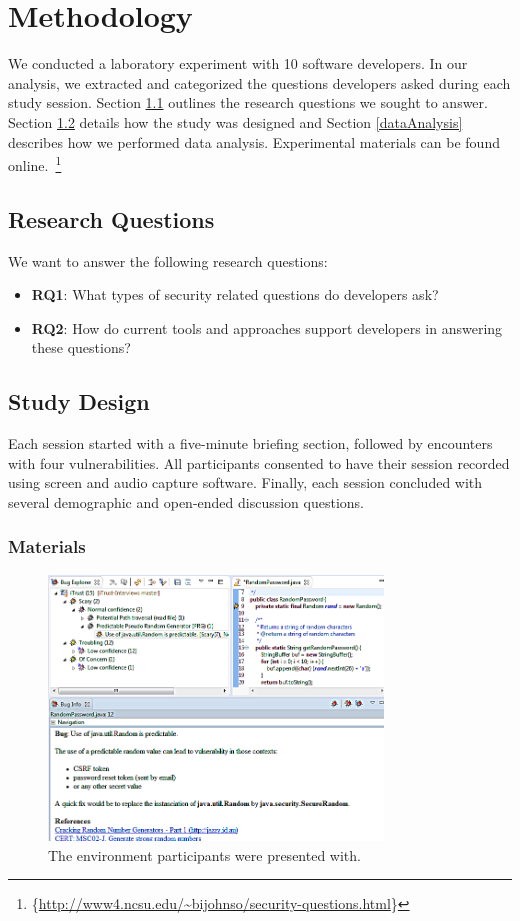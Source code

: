 \documentclass[conference]{IEEEtran}
\newcommand{\blind}[1]{{\color{white}\{#1\}}}
\begin{document}
\section{Methodology}
\label{sec:meth}
We conducted a laboratory experiment with 10 software developers. In our analysis, we extracted and categorized the questions developers asked during each study session. 
Section \ref{rqs} outlines the research questions we sought to answer. 
Section \ref{studyDesign} details how the study was designed and Section \ref{dataAnalysis} describes how we performed data analysis.
Experimental materials can be found online.~\footnote{\blind{\url{http://www4.ncsu.edu/~bijohnso/security-questions.html}}}


\subsection{Research Questions}
\label{rqs}
We want to answer the following research questions:
\begin{itemize}
\item \textbf{RQ1}: What types of security related questions do developers ask?
\item \textbf{RQ2}: How do current tools and approaches support developers in answering these questions?
\end{itemize}


\subsection{Study Design}
\label{studyDesign}
Each session started with a five-minute briefing section, followed by encounters with four vulnerabilities.
All participants consented to have their session recorded using screen and audio capture software.
Finally, each session concluded with several demographic and open-ended discussion questions.


\subsubsection{Materials}
\begin{figure}
\centering
\includegraphics[width=3.5in]{Images/environment.png}
\caption{The environment participants were presented with.}
\label{fig:environment} 
\end{figure}
\end{document}

